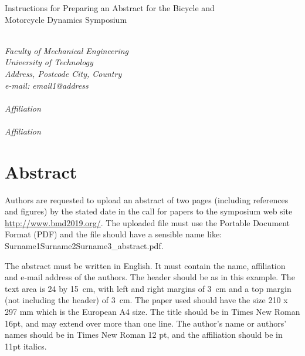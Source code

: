 \documentclass{bmd2019a}
\begin{document}
\begin{flushleft}
{\fontsize{16pt}{20pt}\selectfont%
  Instructions for Preparing an Abstract for the Bicycle and\\}
{\fontsize{16pt}{20pt}\selectfont%
  Motorcycle Dynamics Symposium\\}
\end{flushleft}

\begin{flushleft}
  {\\}
  \textit{Faculty of Mechanical Engineering\\
          University of Technology\\
          Address, Postcode City, Country\\
          e-mail: email1@address
}\vspace{10pt}\\
  {\\}
  \textit{Affiliation}\vspace{10pt}\\
  {\\}
  \textit{Affiliation}\vspace{10pt}\\
\end{flushleft}

\section*{Abstract}
Authors are requested to upload an abstract of two pages (including references
and figures) by the stated date in the call for papers to the symposium web
site \url{http://www.bmd2019.org/}. The uploaded file must use the
Portable Document Format (PDF) and the file should have a sensible name like: Surname1Surname2Surname3\_abstract.pdf.

The abstract must be written in English. It must contain the name, affiliation
and e-mail address of the authors. The header should be as in
this example. The text area is 24 by 15~cm, with left and right margins of
3~cm and a top margin (not including the header) of 3~cm. The paper used should have the size 210 x 297 mm which is the European A4 size. The title should be
in Times New Roman 16pt, and may extend over more than one line. The author's
name or authors' names should be in Times New Roman 12 pt, and the affiliation
should be in 11pt italics.
\end{document}
